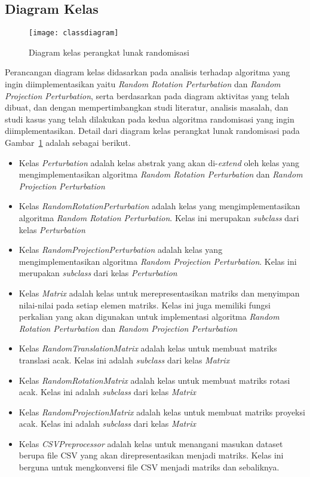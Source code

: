 \subsection{Diagram Kelas}
\label{sec:diagram-kelas}

\begin{figure}
    \centering
    \texttt{[image: classdiagram]}
    \caption{Diagram kelas perangkat lunak randomisasi}
    \label{fig:classdiagram}
\end{figure}

Perancangan diagram kelas didasarkan pada analisis terhadap algoritma yang ingin diimplementasikan yaitu \textit{Random Rotation Perturbation} dan \textit{Random Projection Perturbation}, serta berdasarkan pada diagram aktivitas yang telah dibuat, dan dengan mempertimbangkan studi literatur, analisis masalah, dan studi kasus yang telah dilakukan pada kedua algoritma randomisasi yang ingin diimplementasikan. Detail dari diagram kelas perangkat lunak randomisasi pada Gambar~\ref{fig:classdiagram} adalah sebagai berikut.
\begin{itemize}
    \item Kelas \textit{Perturbation} adalah kelas abstrak yang akan di-\textit{extend} oleh kelas yang mengimplementasikan algoritma \textit{Random Rotation Perturbation} dan \textit{Random Projection Perturbation}
    \item Kelas \textit{RandomRotationPerturbation} adalah kelas yang mengimplementasikan algoritma \textit{Random Rotation Perturbation}. Kelas ini merupakan \textit{subclass} dari kelas \textit{Perturbation}
    \item Kelas \textit{RandomProjectionPerturbation} adalah kelas yang mengimplementasikan algoritma \textit{Random Projection Perturbation}. Kelas ini merupakan \textit{subclass} dari kelas \textit{Perturbation}
    \item Kelas \textit{Matrix} adalah kelas untuk merepresentasikan matriks dan menyimpan nilai-nilai pada setiap elemen matriks. Kelas ini juga memiliki fungsi perkalian yang akan digunakan untuk implementasi algoritma \textit{Random Rotation Perturbation} dan \textit{Random Projection Perturbation}
    \item Kelas \textit{RandomTranslationMatrix} adalah kelas untuk membuat matriks translasi acak. Kelas ini adalah \textit{subclass} dari kelas \textit{Matrix}
    \item Kelas \textit{RandomRotationMatrix} adalah kelas untuk membuat matriks rotasi acak. Kelas ini adalah \textit{subclass} dari kelas \textit{Matrix}
    \item Kelas \textit{RandomProjectionMatrix} adalah kelas untuk membuat matriks proyeksi acak. Kelas ini adalah \textit{subclass} dari kelas \textit{Matrix}
    \item Kelas \textit{CSVPreprocessor} adalah kelas untuk menangani masukan dataset berupa file CSV yang akan direpresentasikan menjadi matriks. Kelas ini berguna untuk mengkonversi file CSV menjadi matriks dan sebaliknya.
\end{itemize}
